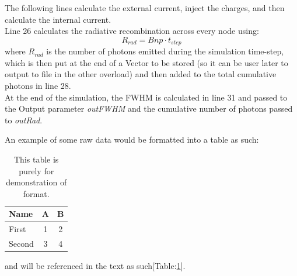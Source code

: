 \documentclass[titlepage]{article}
\begin{document}
The following lines calculate the external current, inject the charges, and then calculate the internal current. \\
Line 26 calculates the radiative recombination across every node using: 
\begin{equation}
	R_{rad} = Bnp\cdot t_{step}
\end{equation}
where $R_{rad}$ is the number of photons emitted during the simulation time-step, which is then put at the end of a Vector to be stored (so it can be user later to output to file in the other overload) and then added to the total cumulative photons in line 28.\\
At the end of the simulation, the FWHM is calculated in line 31 and passed to the Output parameter \textit{outFWHM} and the cumulative number of photons passed to \textit{outRad}.





An example of some raw data would be formatted into a table as such:\\
\begin{table}[h]
	\centering
	\begin{tabular}{|l|c|c|}
		\hline
		\textbf{Name} & \textbf{A} & \textbf{B} \\
		\hline
		First & 1 & 2 \\
		Second & 3 & 4 \\
		\hline
	\end{tabular}
	\caption{\label{tab:appendixTest} This table is purely for demonstration of format.}
\end{table}
and will be referenced in the text as such[Table:\ref{tab:appendixTest}].
\end{document}
